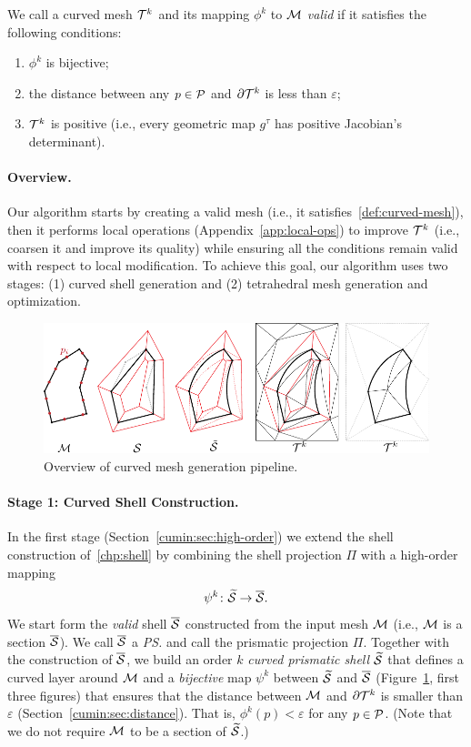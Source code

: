 \begin{definition}\label{def:curved-mesh}
We call a curved mesh $\T^k$ and its mapping $\phi^k$ to $\M$ \emph{valid} if it satisfies the following conditions:
\begin{enumerate}
    \item $\phi^k$ is bijective;
    \item the distance between any $p\in\P$ and $\partial\T^k$ is less than $\varepsilon$;
    \item $\T^k$ is positive (i.e., every geometric map $g^\tau$ has positive Jacobian's determinant).
\end{enumerate}
\end{definition}

\paragraph{Overview.} 
Our algorithm starts by creating a valid mesh (i.e., it satisfies~\ref{def:curved-mesh}), then it performs local operations (Appendix~\ref{app:local-ops}) to improve $\T^k$ (i.e., coarsen it and improve its quality) while ensuring all the conditions remain valid with respect to local modification. 
To achieve this goal, our algorithm uses two stages: (1) curved shell generation and (2) tetrahedral mesh generation and optimization.

\begin{figure}
    \centering
    \includegraphics[width=\linewidth]{curve_meshing_in_shell_tex/figs/illustrations/pipeline.pdf}
    \caption{Overview of curved mesh generation pipeline.}
    \label{bichon:fig:pipeline}
\end{figure}

\paragraph{Stage 1: Curved Shell Construction.}
In the first stage (Section~\ref{cumin:sec:high-order}) we extend the shell construction of~\ref{chp:shell} by combining the shell projection $\Pi$ with {a} high-order mapping 
\[
\psi^k \colon \prS \to \PS.
\]
We start form the \emph{valid} shell $\PS$ constructed from the input mesh $\M$ (i.e., $\M$ is a section $\PS$). We call $\PS$ a \emph{\ps{}} and call the prismatic projection $\Pi$. Together with the construction of $\PS$, we build an order $k$ \emph{curved prismatic shell} $\prS$ that defines a curved layer around $\M$ and a \emph{bijective} map $\psi^k$ between $\prS$ and $\PS$ (Figure~\ref{bichon:fig:pipeline}, first three figures) that ensures that the distance between $\M$ and $\partial\T^k$ is smaller than $\varepsilon$ (Section~\ref{cumin:sec:distance}). That is, $\phi^k(p) < \varepsilon$ for any $p\in\P$. (Note that we do not require $\M$ to be a section of $\prS$.)


